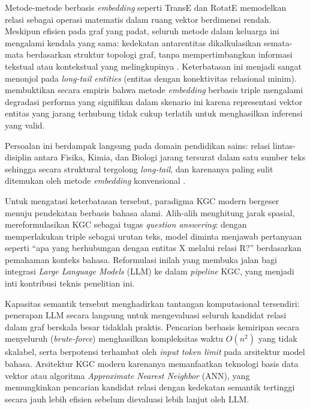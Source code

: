 \documentclass[../../thesis]{subfiles}
\begin{document}
Metode-metode berbasis \textit{embedding} seperti TransE
\parencite{bordes_translating_2013} dan RotatE \parencite{sun_rotate_2019} memodelkan relasi sebagai operasi
matematis dalam ruang vektor berdimensi rendah. Meskipun efisien pada
graf yang padat, seluruh metode dalam keluarga ini mengalami kendala
yang sama: kedekatan antarentitas dikalkulasikan semata-mata berdasarkan
struktur topologi graf, tanpa mempertimbangkan informasi tekstual atau
kontekstual yang melingkupinya \parencite{ji_survey_2022}. Keterbatasan ini
menjadi sangat menonjol pada \textit{long-tail entities} (entitas dengan
konektivitas relasional minim). \textcite{wei_kicgpt_2023} membuktikan secara empiris
bahwa metode \textit{embedding} berbasis triple mengalami degradasi
performa yang signifikan dalam skenario ini karena representasi vektor
entitas yang jarang terhubung tidak cukup terlatih untuk menghasilkan
inferensi yang valid.

Persoalan ini berdampak langsung pada domain pendidikan sains: relasi
lintas-disiplin antara Fisika, Kimia, dan Biologi jarang tersurat dalam
satu sumber teks sehingga secara struktural tergolong \textit{long-tail},
dan karenanya paling sulit ditemukan oleh metode \textit{embedding}
konvensional \parencite{wei_kicgpt_2023}.

Untuk mengatasi keterbatasan tersebut, paradigma KGC modern bergeser menuju pendekatan berbasis
bahasa alami. Alih-alih menghitung jarak spasial, \textcite{yao_exploring_2025}
mereformulasikan KGC sebagai tugas \textit{question answering}: dengan
memperlakukan triple sebagai urutan teks, model diminta menjawab pertanyaan
seperti ``apa yang berhubungan dengan entitas X melalui relasi R?''
berdasarkan pemahaman konteks bahasa. Reformulasi inilah yang membuka jalan
bagi integrasi \textit{Large Language Models} (LLM) ke dalam \textit{pipeline} KGC,
yang menjadi inti kontribusi teknis penelitian ini.

Kapasitas semantik tersebut menghadirkan tantangan komputasional
tersendiri: penerapan LLM secara langsung untuk mengevaluasi seluruh
kandidat relasi dalam graf berskala besar tidaklah praktis. Pencarian
berbasis kemiripan secara menyeluruh (\textit{brute-force}) menghasilkan
kompleksitas waktu $O(n^2)$ yang tidak skalabel, serta berpotensi
terhambat oleh \textit{input token limit} pada arsitektur model bahasa.
Arsitektur KGC modern karenanya memanfaatkan teknologi basis data vektor
atau algoritma \textit{Approximate Nearest Neighbor} (ANN), yang
memungkinkan pencarian kandidat relasi dengan kedekatan semantik
tertinggi secara jauh lebih efisien sebelum dievaluasi lebih lanjut oleh
LLM.
\end{document}
